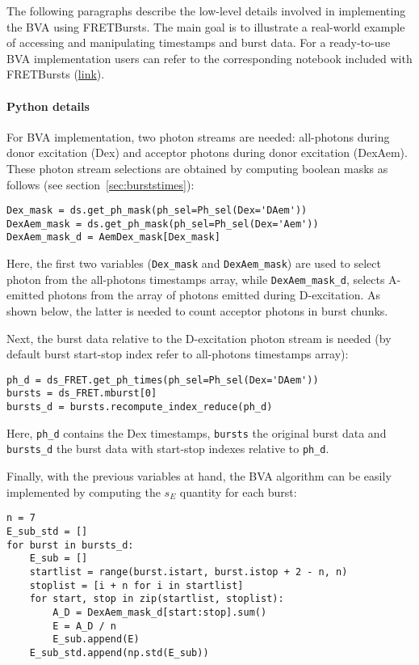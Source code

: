 The following paragraphs describe the low-level details involved in implementing the BVA using FRETBursts.
The main goal is to illustrate a real-world example of accessing and manipulating timestamps and burst data.
For a ready-to-use BVA implementation users can refer to the corresponding notebook included with FRETBursts
(\href{http://nbviewer.jupyter.org/github/tritemio/FRETBursts_notebooks/blob/master/notebooks/Example%20-%20Burst%20Variance%20Analysis.ipynb}{link}).

\paragraph{Python details}
For BVA implementation, two photon streams are needed: all-photons during donor excitation (Dex) 
and acceptor photons during donor excitation (DexAem). 
These photon stream selections are obtained by computing boolean masks as follows 
(see section~\ref{sec:burststimes}):

\begin{lstlisting}
Dex_mask = ds.get_ph_mask(ph_sel=Ph_sel(Dex='DAem'))   
DexAem_mask = ds.get_ph_mask(ph_sel=Ph_sel(Dex='Aem'))
DexAem_mask_d = AemDex_mask[Dex_mask]
\end{lstlisting}

Here, the first two variables (\verb|Dex_mask| and \verb|DexAem_mask|) are used to
select photon from the all-photons timestamps array,
while \verb|DexAem_mask_d|, selects A-emitted photons from the
array of photons emitted during D-excitation. As shown below, 
the latter is needed to count acceptor photons in burst chunks.

Next, the burst data relative to the D-excitation photon stream is needed (by default 
burst start-stop index refer to all-photons timestamps array):

\begin{lstlisting}
ph_d = ds_FRET.get_ph_times(ph_sel=Ph_sel(Dex='DAem'))
bursts = ds_FRET.mburst[0] 
bursts_d = bursts.recompute_index_reduce(ph_d)
\end{lstlisting}

Here, \verb|ph_d| contains the Dex timestamps, \verb|bursts| the original burst data and 
\verb|bursts_d| the burst data with start-stop indexes relative to \verb|ph_d|.

Finally, with the previous variables at hand, the BVA algorithm
can be easily implemented by computing the $s_E$ quantity for each burst:

\begin{lstlisting}
n = 7
E_sub_std = []
for burst in bursts_d:
    E_sub = []
    startlist = range(burst.istart, burst.istop + 2 - n, n)
    stoplist = [i + n for i in startlist]
    for start, stop in zip(startlist, stoplist): 
        A_D = DexAem_mask_d[start:stop].sum()
        E = A_D / n
        E_sub.append(E)
    E_sub_std.append(np.std(E_sub))
\end{lstlisting}

